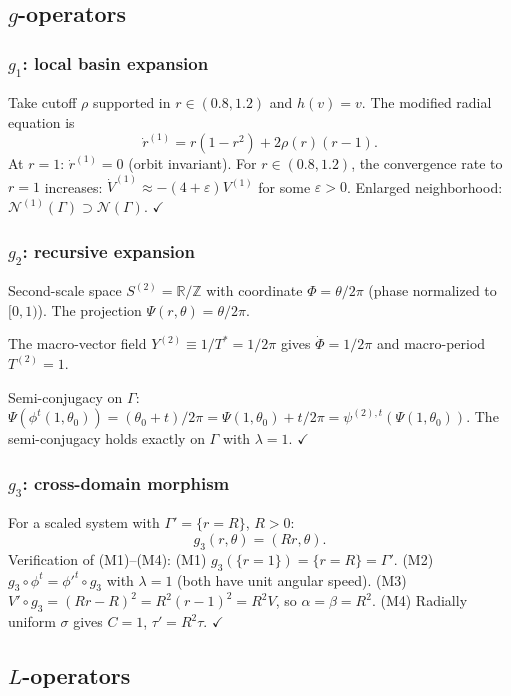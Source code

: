 \documentclass[12pt, oneside]{book}
\theoremstyle{plain}
\theoremstyle{definition}
\theoremstyle{remark}
\newcommand{\R}{\mathbb{R}}
\newcommand{\Orb}{\Gamma}
\newcommand{\cN}{\mathcal{N}}
\newcommand{\eps}{\varepsilon}
\begin{document}
\subsection{\texorpdfstring{$g$}{g}-operators}

\subsubsection{$g_1$: local basin expansion}

Take cutoff $\rho$ supported in $r\in(0.8,1.2)$ and $h(v)=v$.
The modified radial equation is
\[
  \dot r^{(1)} = r(1-r^2) + 2\rho(r)(r-1).
\]
At $r=1$: $\dot r^{(1)}=0$ (orbit invariant). For $r\in(0.8,1.2)$,
the convergence rate to $r=1$ increases:
$\dot V^{(1)}\approx-(4+\eps)V^{(1)}$ for some $\eps>0$.
Enlarged neighborhood: $\cN^{(1)}(\Orb)\supset\cN(\Orb)$. $\checkmark$

\subsubsection{$g_2$: recursive expansion}

Second-scale space $S^{(2)}=\R/\mathbb{Z}$ with coordinate
$\Phi=\theta/2\pi$ (phase normalized to $[0,1)$).
The projection $\Psi(r,\theta)=\theta/2\pi$.

The macro-vector field $Y^{(2)}\equiv 1/T^*=1/2\pi$ gives
$\dot\Phi=1/2\pi$ and macro-period $T^{(2)}=1$.

Semi-conjugacy on $\Orb$: $\Psi(\phi^t(1,\theta_0))=(\theta_0+t)/2\pi
=\Psi(1,\theta_0)+t/2\pi=\psi^{(2),t}(\Psi(1,\theta_0))$.
The semi-conjugacy holds exactly on $\Orb$ with $\lambda=1$. $\checkmark$

\subsubsection{$g_3$: cross-domain morphism}

For a scaled system with $\Orb'=\{r=R\}$, $R>0$:
\[
  g_3(r,\theta) = (Rr,\theta).
\]
Verification of (M1)--(M4):
(M1) $g_3(\{r=1\})=\{r=R\}=\Orb'$.
(M2) $g_3\circ\phi^t=\phi'^t\circ g_3$ with $\lambda=1$ (both
     have unit angular speed).
(M3) $V'\circ g_3=(Rr-R)^2=R^2(r-1)^2=R^2 V$, so $\alpha=\beta=R^2$.
(M4) Radially uniform $\sigma$ gives $C=1$, $\tau'=R^2\tau$. $\checkmark$

\subsection{\texorpdfstring{$L$}{L}-operators}
\end{document}
